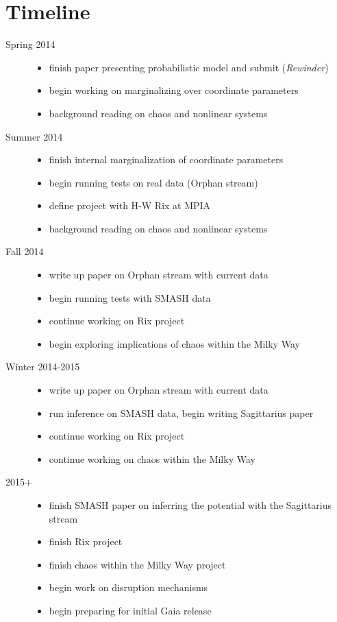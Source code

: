 \documentclass[letterpaper,12pt,preprint]{aastex}
\newcommand{\rewinder}{\emph{Rewinder}}
\begin{document}
\section{Timeline}
\noindent\begin{description}
	\item[Spring 2014] 
		\noindent\begin{itemize}
			\item finish paper presenting probabilistic model and submit (\rewinder)
			\item begin working on marginalizing over coordinate parameters
			\item background reading on chaos and nonlinear systems
		\end{itemize}
	\item[Summer 2014] 
		\noindent\begin{itemize}
			\item finish internal marginalization of coordinate parameters
			\item begin running tests on real data (Orphan stream)
			\item define project with H-W Rix at MPIA
			\item background reading on chaos and nonlinear systems
		\end{itemize}
	\item[Fall 2014] 
		\noindent\begin{itemize}
			\item write up paper on Orphan stream with current data
			\item begin running tests with SMASH data
			\item continue working on Rix project
			\item begin exploring implications of chaos within the Milky Way
		\end{itemize}
	\item[Winter 2014-2015] 
		\noindent\begin{itemize}
			\item write up paper on Orphan stream with current data
			\item run inference on SMASH data, begin writing Sagittarius paper
			\item continue working on Rix project
			\item continue working on chaos within the Milky Way
		\end{itemize}
	\item[2015+] 
		\noindent\begin{itemize}
			\item finish SMASH paper on inferring the potential with the Sagittarius stream
			\item finish Rix project
			\item finish chaos within the Milky Way project
			\item begin work on disruption mechanisms
			\item begin preparing for initial Gaia release
		\end{itemize}
\end{description}



\end{document}
